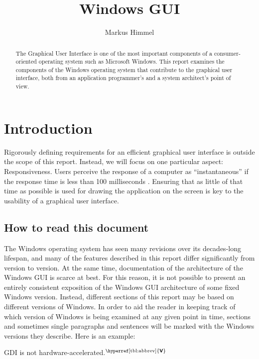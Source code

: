 \documentclass[10pt,twocolumn,a4paper,os=win]{article}
\author{Markus Himmel}
\title{Windows GUI}
\newcommand{\bs}[1]{\textbf{\sffamily #1}}
\newcommand{\winver}[1]{$^{\text{\hyperref[tbl:abbrev]{\bs{#1}}}}$}
\begin{document}
	\maketitle

	\begin{abstract}
		The Graphical User Interface is one of the most important components
		of a consumer-oriented operating system such as Microsoft Windows. This
		report examines the components of the Windows operating system that
		contribute to the graphical user interface, both from an application
		programmer's and a system architect's point of view. %
	\end{abstract}

	\section{Introduction}

		Rigorously defining requirements for an efficient graphical user
		interface is outside the scope of this report. Instead, we will focus
		on one particular aspect: Responsiveness. Users perceive the response
		of a computer as \enquote{instantaneous} if the response time is less
		than 100 milliseconds \cite{miller1968response}. Ensuring that as
		little of that time as possible is used for drawing the application on
		the screen is key to the usability of a graphical user interface.

		\subsection{How to read this document}
			The Windows operating system has seen many revisions over its
			decades-long lifespan, and many of the features described in this
			report differ significantly from version to version. At the same
			time, documentation of the architecture of the Windows GUI is
			scarce at best.  For this reason, it is not possible to present an
			entirely consistent exposition of the Windows GUI architecture of
			some fixed Windows version.  Instead, different sections of this
			report may be based on different versions of Windows. In order to
			aid the reader in keeping track of which version of Windows is
			being examined at any given point in time, sections and sometimes
			single paragraphs and sentences will be marked with the Windows
			versions they describe. Here is an example:

			GDI is not hardware-accelerated.\winver{V}
\end{document}
